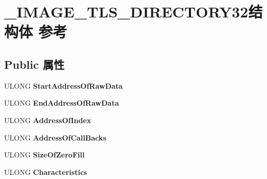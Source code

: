 \hypertarget{struct___i_m_a_g_e___t_l_s___d_i_r_e_c_t_o_r_y32}{}\section{\+\_\+\+I\+M\+A\+G\+E\+\_\+\+T\+L\+S\+\_\+\+D\+I\+R\+E\+C\+T\+O\+R\+Y32结构体 参考}
\label{struct___i_m_a_g_e___t_l_s___d_i_r_e_c_t_o_r_y32}
\subsection*{Public 属性}
\begin{DoxyCompactItemize}
\item 
\mbox{\label{struct___i_m_a_g_e___t_l_s___d_i_r_e_c_t_o_r_y32_a13f9ff41f7d83fc960403da38384179f}} 
U\+L\+O\+NG {\bfseries Start\+Address\+Of\+Raw\+Data}
\item 
\mbox{\label{struct___i_m_a_g_e___t_l_s___d_i_r_e_c_t_o_r_y32_a568125ae57c613094b665f06a0e08c71}} 
U\+L\+O\+NG {\bfseries End\+Address\+Of\+Raw\+Data}
\item 
\mbox{\label{struct___i_m_a_g_e___t_l_s___d_i_r_e_c_t_o_r_y32_a67d9212971ce5ef97ff866159198760a}} 
U\+L\+O\+NG {\bfseries Address\+Of\+Index}
\item 
\mbox{\label{struct___i_m_a_g_e___t_l_s___d_i_r_e_c_t_o_r_y32_ad09008a9ff57c9dae536c730c64baca4}} 
U\+L\+O\+NG {\bfseries Address\+Of\+Call\+Backs}
\item 
\mbox{\label{struct___i_m_a_g_e___t_l_s___d_i_r_e_c_t_o_r_y32_a9a50a2b698dddb6beee452ecfefada87}} 
U\+L\+O\+NG {\bfseries Size\+Of\+Zero\+Fill}
\item 
\mbox{\label{struct___i_m_a_g_e___t_l_s___d_i_r_e_c_t_o_r_y32_af781df1bdf72dec043e67fd5cf97340e}} 
U\+L\+O\+NG {\bfseries Characteristics}
\item 
\mbox{\label{struct___i_m_a_g_e___t_l_s___d_i_r_e_c_t_o_r_y32_a132e912376ff214a7ca2df977890c58d}} 

\end{DoxyCompactItemize}
